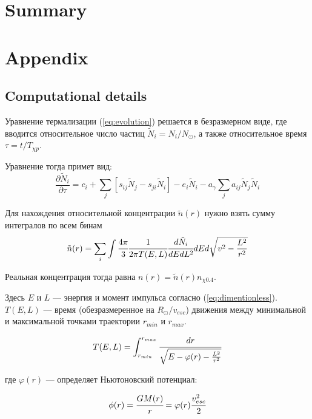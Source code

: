 \documentclass[a4paper, 14pt]{article}
\newcommand{\deriv}[2]{\frac{\partial #1}{\partial #2}}
\begin{document}
	
	\section{Summary}
	
	\section{Appendix}
	\subsection{Computational details}
Уравнение термализации (\ref{eq:evolution}) решается в безразмерном виде, где вводится относительное число частиц $\tilde{N}_i = N_i/N_{\odot}$, а также относительное время $\tau = t/T_{\chi p}$.

Уравнение тогда примет вид:
\begin{equation}
	\label{eq:relevolve}
	\deriv{\tilde{N}_i}{\tau} = c_i +
	\sum_j{[s_{ij} \tilde{N}_{j} - s_{ji} \tilde{N}_{i} ]} - e_{i} \tilde{N}_i - a_{\gamma} \sum_j {a_{ij} \tilde{N}_j \tilde{N}_i}
\end{equation}

Для нахождения относительной концентрации $\tilde{n}(r)$ нужно взять сумму интегралов по всем бинам
\begin{equation}
	\label{eq:reldens}
	\tilde{n}(r) = \sum_i{\int{\cfrac{4\pi}{3} \cfrac{1}{2\pi T(E,L)} \cfrac{d\tilde{N}_i}{dEdL^2} dE d\sqrt{v^2-\frac{L^2}{r^2}} }}
\end{equation}

Реальная концентрация тогда равна $n(r) = \tilde{n}(r) n_{\chi 0.4}$. 

Здесь $E$ и $L$ --- энергия и момент импульса согласно (\ref{eq:dimentionless}). $T(E,L)$ --- время (обезразмеренное на $R_{\odot}/v_{esc}$) движения между минимальной и максимальной точками траектории $r_{min}$ и $r_{max}$.

\begin{equation*}
	T(E,L) = \int_{r_{min}}^{r_{max}}{\cfrac{dr}{
			\sqrt{E - \varphi(r) - \frac{L^2}{r^2}}
		} 
	}
\end{equation*}

где $\varphi(r)$ --- определяет Ньютоновский потенциал:

\begin{equation*}
	\phi(r) = \cfrac{GM(r)}{r} = \varphi(r) \cfrac{v_{esc}^2}{2} 
\end{equation*}
\end{document}
